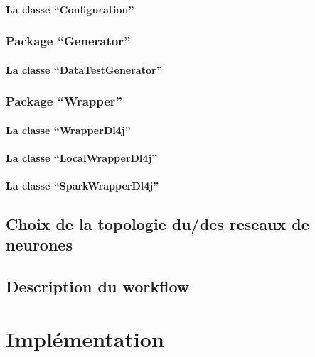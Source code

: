 \documentclass[a4paper,10pt,openany,oneside]{sphinxmanual}
\begin{document}
\subsubsection{La classe ``Configuration''}
\label{index:la-classe-configuration}

\subsection{Package ``Generator''}
\label{index:package-generator}

\subsubsection{La classe ``DataTestGenerator''}
\label{index:la-classe-datatestgenerator}

\subsection{Package ``Wrapper''}
\label{index:package-wrapper}

\subsubsection{La classe ``WrapperDl4j''}
\label{index:la-classe-wrapperdl4j}

\subsubsection{La classe ``LocalWrapperDl4j''}
\label{index:la-classe-localwrapperdl4j}

\subsubsection{La classe ``SparkWrapperDl4j''}
\label{index:la-classe-sparkwrapperdl4j}

\section{Choix de la topologie du/des reseaux de neurones}
\label{index:choix-de-la-topologie-du-des-reseaux-de-neurones}

\section{Description du workflow}
\label{index:description-du-workflow}

\chapter{Implémentation}
\label{index:implementation}
\end{document}
